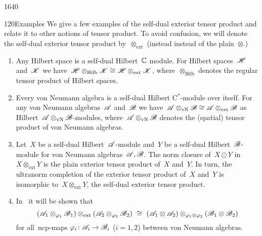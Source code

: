 \begin{parsec}{1640}
\begin{point}{120}{Examples}%
We give a few examples of the self-dual exterior tensor product
    and relate it to other notions of tensor product.
To avoid confusion, we will denote the self-dual exterior
    tensor product by~$\otimes_{\text{ext}}$
    (instead instead of the plain~$\otimes$.)
\begin{enumerate}
\item
Any Hilbert space is a self-dual Hilbert~$\mathbb{C}$ module.
For Hilbert spaces~$\mathscr{H}$ and~$\mathscr{K}$
    we have~$\mathscr{H} \otimes_{\text{Hilb}} \mathscr{K}
        \cong \mathscr{H} \otimes_{\text{ext}} \mathscr{K}$,
    where~$\otimes_{\text{Hilb}}$ denotes the regular tensor product of
    Hilbert spaces.
\item
Every von Neumann algebra is a self-dual Hilbert C$^*$-module
    over itself.
For any von Neumann algebras~$\mathscr{A}$ and~$\mathscr{B}$
    we have~$\mathscr{A}\otimes_{\text{vN}} \mathscr{B}
        \cong \mathscr{A} \otimes_{\text{ext}} \mathscr{B}$
        as Hilbert~$\mathscr{A}\otimes_{\text{vN}} \mathscr{B}$-modules,
        where~$\mathscr{A}\otimes_{\text{vN}}\mathscr{B}$ denotes the (spatial)
        tensor product of von Neumann algebras.
\item
Let~$X$ be a self-dual Hilbert~$\mathscr{A}$-module
    and~$Y$ be a self-dual Hilbert~$\mathscr{B}$-module
        for von Neumann algebras~$\mathscr{A},\mathscr{B}$.
The norm closure of~$X\odot Y$
    in~$X \otimes_{\text{ext}} Y$
        is the plain exterior tensor product of~$X$ and~$Y$.
In turn, the ultranorm completion of the exterior tensor product
    of~$X$ and~$Y$ is isomorphic to~$X \otimes_{\text{ext}} Y$,
        the self-dual exterior tensor product.
\item
In~ it will be shown that
\begin{equation*}
(\scrA_1 \otimes_{\varphi_1} \scrB_1)
    \otimes_{\text{ext}} (\scrA_2 \otimes_{\varphi_2} \scrB_2)
\ \cong \ 
(\scrA_1 \otimes \scrA_2) \otimes_{\varphi_1\otimes \varphi_2} (\scrB_1 \otimes \scrB_2)
\end{equation*}
        for all~ncp-maps $\varphi_i\colon \mathscr{A}_i \to \mathscr{B}_i$ ($i=1,2$)
    between von Neumann algebras.
\end{enumerate}
\end{point}
\end{parsec}
